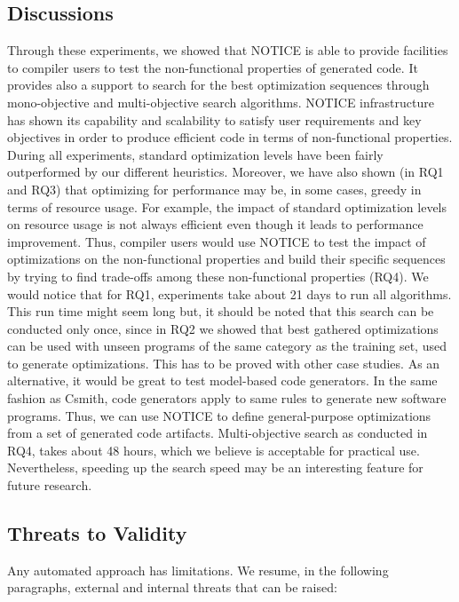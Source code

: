 		\subsection{Discussions}
		Through these experiments, we showed that NOTICE is able to provide facilities to compiler users to test the non-functional properties of generated code. It provides also a support to search for the best optimization sequences through mono-objective and multi-objective search algorithms. NOTICE infrastructure has shown its capability and scalability to satisfy user requirements and key objectives in order to produce efficient code in terms of non-functional properties. During all experiments, standard optimization levels have been fairly outperformed by our different heuristics. 
		Moreover, we have also shown (in RQ1 and RQ3) that optimizing for performance may be, in some cases, greedy in terms of resource usage. For example, the impact of standard optimization levels on resource usage is not always efficient even though it leads to performance improvement. 
		Thus, compiler users would use NOTICE to test the impact of optimizations on the non-functional properties and build their specific sequences by trying to find trade-offs among these non-functional properties (RQ4). We would notice that for RQ1, experiments take about 21 days to run all algorithms. This run time might seem long but, it should be noted that this search can be conducted only once, since in RQ2 we showed that best gathered optimizations can be used with unseen programs of the same category as the training set, used to generate optimizations. This has to be proved with other case studies. As an alternative, it would be great to test model-based code generators. In the same fashion as Csmith, code generators apply to same rules to generate new software programs. Thus, we can use NOTICE to define general-purpose optimizations from a set of generated code artifacts. 
		Multi-objective search as conducted in RQ4, takes about 48 hours, which we believe is acceptable for practical use. Nevertheless, speeding up the search speed may be an interesting feature for future research.
		
		
		
		
		\subsection{Threats to Validity}
		Any automated approach has limitations. We resume, in the following paragraphs, external and internal threats that can be raised:
		

